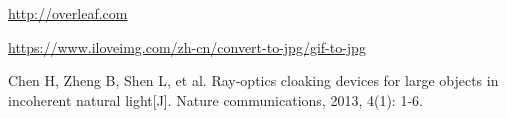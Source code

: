 \documentclass[a4paper]{article}
\begin{document}
\newpage
\begin{thebibliography}{9} %
  \url{http://overleaf.com}

  \url{https://www.iloveimg.com/zh-cn/convert-to-jpg/gif-to-jpg }

Chen H, Zheng B, Shen L, et al. Ray-optics cloaking devices for large objects in incoherent natural light[J]. Nature communications, 2013, 4(1): 1-6.

\end{thebibliography}
\end{document}
